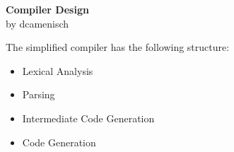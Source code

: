\documentclass[10pt, landscape, a4paper]{article}
\begin{document}
\begin{multicols*}{3}


\begin{center}
	\Large{\textbf{Compiler Design}} \\
    \small{by dcamenisch}
\end{center}



The simplified compiler has the following structure:
\begin{itemize}
	\item Lexical Analysis
	\item Parsing
	\item Intermediate Code Generation
	\item Code Generation
\end{itemize}





\end{multicols*}
\end{document}
